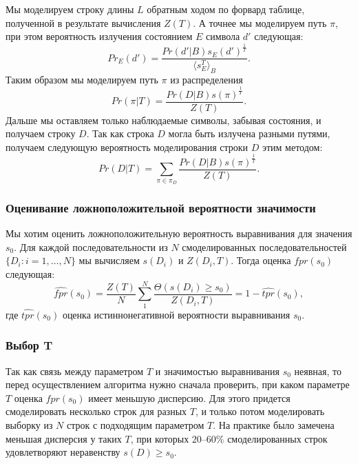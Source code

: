 \documentclass[]{article}
\begin{document}
			Мы моделируем строку длины $L$ обратным ходом по форвард таблице, полученной в результате вычисления $Z(T)$. А точнее мы моделируем путь $\pi$, при этом вероятность излучения состоянием $E$ символа $d'$ следующая:
			\begin{equation}
				Pr_{E}(d') = \frac{Pr(d'|B)s_{E}(d')^{\frac{1}{T}}} {\langle s_{E}^{T} \rangle_{B}}.
			\end{equation}			
			Таким образом мы моделируем путь $\pi$ из распределения 
			\begin{equation}
				Pr(\pi|T) = \frac{Pr(D|B)s(\pi)^{\frac{1}{T}}}{Z(T)}.
			\end{equation}
			Дальше мы оставляем только наблюдаемые символы, забывая состояния, и получаем строку $D$. Так как строка $D$ могла быть излучена разными путями, получаем следующую вероятность моделирования строки $D$ этим методом:
			\begin{equation}				
				Pr(D|T) = \sum_{\pi \in \pi_{D}} \frac{Pr(D|B)s(\pi)^{\frac{1}{T}}}{Z(T)}.
			\end{equation}	
			
			\subsubsection{Оценивание ложноположительной вероятности значимости}			
			Мы хотим оценить ложноположительную вероятность выравнивания для значения $s_{0}$. Для каждой последовательности из $N$ смоделированных последовательностей $\{D_{i}:i=1,\dots,N\}$ мы вычисляем $s(D_{i})$ и $Z(D_{i}, T)$. Тогда оценка $fpr(s_{0})$ следующая:
			\begin{equation}	
				\widehat{fpr}(s_{0}) = \frac{Z(T)}{N} \sum_{1}^{N} \frac{\Theta(s(D_{i}) \geq s_{0})}{Z(D_{i}, T)} = 1-\widehat{tpr}(s_{0}),
			\end{equation}				
			где $\widehat{tpr}(s_{0})$ оценка истиннонегативной вероятности выравнивания $s_{0}$.
			
			\subsubsection{Выбор T}
			Так как связь между параметром $T$ и значимостью выравнивания $s_{0}$ неявная, то перед осуществлением алгоритма нужно сначала проверить, при каком параметре $T$ оценка $fpr(s_{0})$ имеет меньшую дисперсию. Для этого придется смоделировать несколько строк для разных $T$, и только потом моделировать выборку из $N$ строк с подходящим параметром $T$. На практике было замечена меньшая дисперсия у таких $T$, при которых 20--60$\%$ смоделированных строк удовлетворяют неравенству $s(D) \geq s_{0}$.
			
\end{document}
